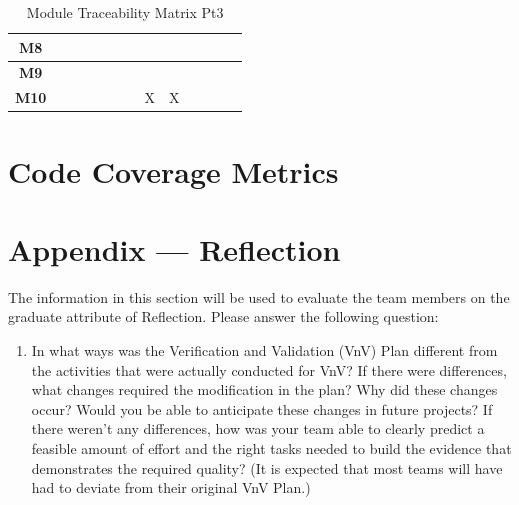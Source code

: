 \documentclass[12pt, titlepage]{article}
\begin{document}
\begin{table}[H]
\begin{tabular}{|c|c|c|c|c|c|c|c|c|c|c|c|c|}
    \textbf{M8}  &                       &                       &                       &                       &                     &                     &                     &                     &                     &                     &                     &                         \\ \hline
    \textbf{M9}  &                       &                       &                       &                       &                     &                     &                     &                     &                     &                     &                     &                         \\ \hline
    \textbf{M10} &                       &                       &                       &                       &                     &                     & X                   & X                   &                     &                     &                     &                         \\ \hline
  \end{tabular}
  \caption{Module Traceability Matrix Pt3}
  \label{Table:C_Mod_trace}
\end{table}
\newpage

\section{Code Coverage Metrics}

%
%

\newpage{}
\section*{Appendix --- Reflection}

The information in this section will be used to evaluate the team members on the
graduate attribute of Reflection.  Please answer the following question:

\begin{enumerate}
  \item In what ways was the Verification and Validation (VnV) Plan different
        from the activities that were actually conducted for VnV?  If there were
        differences, what changes required the modification in the plan?  Why did
        these changes occur?  Would you be able to anticipate these changes in future
        projects?  If there weren't any differences, how was your team able to clearly
        predict a feasible amount of effort and the right tasks needed to build the
        evidence that demonstrates the required quality?  (It is expected that most
        teams will have had to deviate from their original VnV Plan.)
\end{enumerate}
\end{document}

